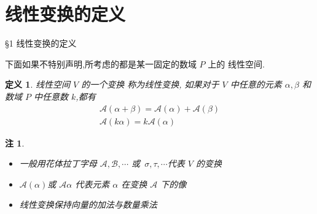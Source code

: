 \documentclass[13pt]{beamer}
\newtheorem*{defi}{定义}
\newtheorem*{rem}{注}
\def\A{\mathscr{A}}
\def\a{\alpha}
\begin{document}
\section{线性变换的定义}
\begin{frame}{\S 1  线性变换的定义}

%
%


下面如果不特别声明,所考虑的都是某一固定的数域 $P$ 上的
线性空间.

\begin{defi}
线性空间 $V$ 的一个变换 称为线性变换, 如果对于 $V$ 中任意的元素 ${\alpha}, {\beta}$ 和数域 $P$ 中任意数 $k$,都有
\[
\begin{array}{c}
\mathscr{A}({\alpha}+{\beta})=\mathscr{A}({\alpha})+\mathscr{A}({\beta}) \\
\mathscr{A}({k} {\alpha})=k \mathscr{A}({\alpha})
\end{array}
\]
\end{defi}

\begin{rem}
\begin{itemize}
\item 一般用花体拉丁字母 $\mathscr{A}, \mathscr{B}, \cdots$ 或 $\sigma,\tau, \cdots$代表 $V$ 的变换
\item $\mathscr{A}({\alpha})$或 $\A \a$ 代表元素 ${\alpha}$ 在变换 $\A$ 下的像
\item 线性变换保持向量的加法与数量乘法
\end{itemize}
\end{rem}
\end{frame}
\end{document}
